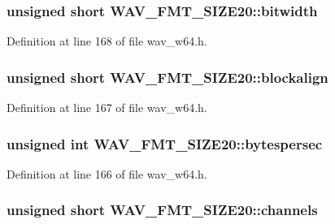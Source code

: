 \subsubsection[{\texorpdfstring{bitwidth}{bitwidth}}]{\setlength{\rightskip}{0pt plus 5cm}unsigned short W\+A\+V\+\_\+\+F\+M\+T\+\_\+\+S\+I\+Z\+E20\+::bitwidth}\hypertarget{struct_w_a_v___f_m_t___s_i_z_e20_abd5cbcb0154487f790f76ecfb16dbc74}{}\label{struct_w_a_v___f_m_t___s_i_z_e20_abd5cbcb0154487f790f76ecfb16dbc74}


Definition at line 168 of file wav\+\_\+w64.\+h.

\subsubsection[{\texorpdfstring{blockalign}{blockalign}}]{\setlength{\rightskip}{0pt plus 5cm}unsigned short W\+A\+V\+\_\+\+F\+M\+T\+\_\+\+S\+I\+Z\+E20\+::blockalign}\hypertarget{struct_w_a_v___f_m_t___s_i_z_e20_a94ca6862da9f28f74f7c870f0412f2de}{}\label{struct_w_a_v___f_m_t___s_i_z_e20_a94ca6862da9f28f74f7c870f0412f2de}


Definition at line 167 of file wav\+\_\+w64.\+h.

\subsubsection[{\texorpdfstring{bytespersec}{bytespersec}}]{\setlength{\rightskip}{0pt plus 5cm}unsigned {\bf int} W\+A\+V\+\_\+\+F\+M\+T\+\_\+\+S\+I\+Z\+E20\+::bytespersec}\hypertarget{struct_w_a_v___f_m_t___s_i_z_e20_abfb4140bf774b99624623b5efad914bc}{}\label{struct_w_a_v___f_m_t___s_i_z_e20_abfb4140bf774b99624623b5efad914bc}


Definition at line 166 of file wav\+\_\+w64.\+h.

\subsubsection[{\texorpdfstring{channels}{channels}}]{\setlength{\rightskip}{0pt plus 5cm}unsigned short W\+A\+V\+\_\+\+F\+M\+T\+\_\+\+S\+I\+Z\+E20\+::channels}\hypertarget{struct_w_a_v___f_m_t___s_i_z_e20_a57119fcb5420cc2bd7708713ccefde13}{}\label{struct_w_a_v___f_m_t___s_i_z_e20_a57119fcb5420cc2bd7708713ccefde13}


